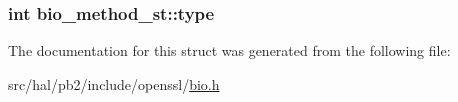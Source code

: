 \subsubsection[{\texorpdfstring{type}{type}}]{\setlength{\rightskip}{0pt plus 5cm}int bio\+\_\+method\+\_\+st\+::type}\hypertarget{structbio__method__st_aa17907bd09e726ddc073966bdd224b5b}{}\label{structbio__method__st_aa17907bd09e726ddc073966bdd224b5b}


The documentation for this struct was generated from the following file\+:\begin{DoxyCompactItemize}
\item 
src/hal/pb2/include/openssl/\hyperlink{bio_8h}{bio.\+h}\end{DoxyCompactItemize}
